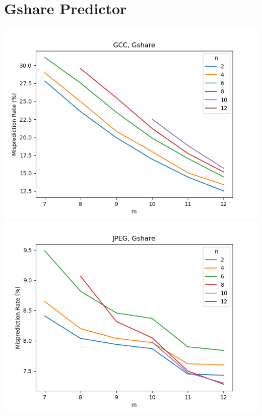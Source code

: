 \documentclass{article}
\begin{document}
\begin{center}
    \end{center}

    \section{Gshare Predictor}

    \begin{center}
        
        \includegraphics[scale=0.83]{../graph_logs/GCC_gshare.png}
        \includegraphics[scale=0.83]{../graph_logs/JPEG_gshare.png}

\end{center}
\end{document}
